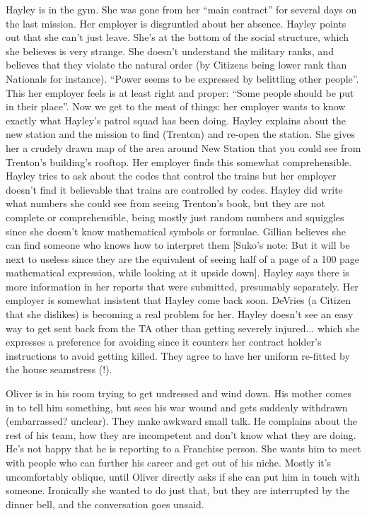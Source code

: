 Hayley is in the gym.  She was gone from her ``main contract'' for several days on the last mission.  Her employer is disgruntled about her absence.  Hayley points out that she can't just leave.  She's at the bottom of the social structure, which she believes is very strange.  She doesn't understand the military ranks, and believes that they violate the natural order (by Citizens being lower rank than Nationals for instance).  ``Power seems to be expressed by belittling other people''.  This her employer feels is at least right and proper: ``Some people should be put in their place''.  Now we get to the meat of things: her employer wants to know exactly what Hayley's patrol squad has been doing.  Hayley explains about the new station and the mission to find (Trenton) and re-open the station.  She gives her a crudely drawn map of the area around New Station that you could see from Trenton's building's rooftop.  Her employer finds this somewhat comprehensible.  Hayley tries to ask about the codes that control the trains but her employer doesn't find it believable that trains are controlled by codes.  Hayley did write what numbers she could see from seeing Trenton's book, but they are not complete or comprehensible, being mostly just random numbers and squiggles since she doesn't know mathematical symbols or formulae. Gillian believes she can find someone who knows how to interpret them {[}Suko's note: But it will be next to useless since they are the equivalent of seeing half of a page of a 100 page mathematical expression, while looking at it upside down{]}.  Hayley says there is more information in her reports that were submitted, presumably separately.  Her employer is somewhat insistent that Hayley come back soon.  DeVries (a Citizen that she dislikes) is becoming a real problem for her.  Hayley doesn't see an easy way to get sent back from the TA other than getting severely injured... which she expresses a preference for avoiding since it counters her contract holder's instructions to avoid getting killed.  They agree to have her uniform re-fitted by the house seamstress (!).



Oliver is in his room trying to get undressed and wind down.  His mother comes in to tell him something, but sees his war wound and gets suddenly withdrawn (embarrassed?  unclear).  They make awkward small talk.  He complains about the rest of his team, how they are incompetent and don't know what they are doing.  He's not happy that he is reporting to a Franchise person.  She wants him to meet with people who can further his career and get out of his niche.  Mostly it's uncomfortably oblique, until Oliver directly asks if she can put him in touch with someone.  Ironically she wanted to do just that, but they are interrupted by the dinner bell, and the conversation goes unsaid.


